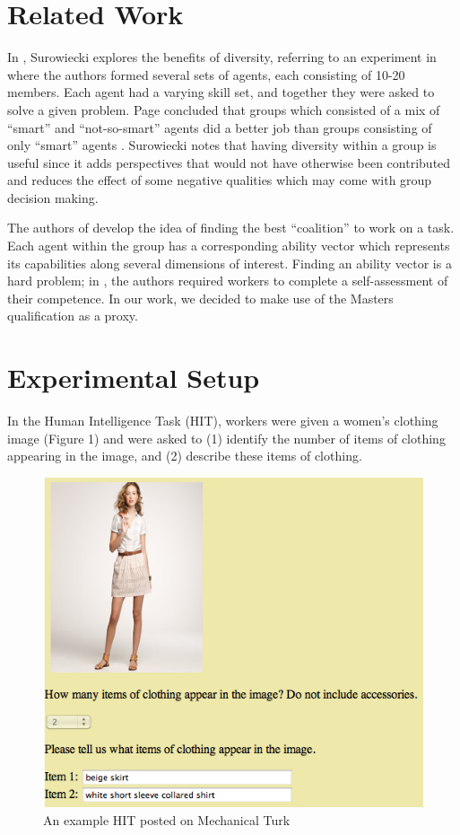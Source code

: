 \documentclass{chi2012}
\newcommand{\tab}{\hspace*{2em}}
\begin{document}
\section{Related Work}
\tab In \cite{wisdomOfCrowds}, Surowiecki explores the benefits of diversity, referring to an experiment in \cite{HongPage:2000} where the authors formed several sets of agents, each consisting of 10-20 members. Each agent had a varying skill set, and together they were asked to solve a given problem. Page concluded that groups which consisted of a mix of ``smart'' and ``not-so-smart'' agents did a better job than groups consisting of only ``smart'' agents \cite{HongPage:2000}. Surowiecki notes that having diversity within a group is useful since it adds perspectives that would not have otherwise been contributed and reduces the effect of some negative qualities which may come with group decision making.

\tab The authors of \cite{ShahafHorvitz:2010} develop the idea of finding the best ``coalition'' to work on a task. Each agent within the group has a corresponding ability vector which represents its capabilities along several dimensions of interest. Finding an ability vector is a hard problem; in \cite{ShahafHorvitz:2010}, the authors required workers to complete a self-assessment of their competence. In our work, we decided to make use of the Masters qualification as a proxy. 

\section{Experimental Setup}
\tab In the Human Intelligence Task (HIT), workers were given a women's clothing image (Figure 1) and were asked to (1) identify the number of items of clothing appearing in the image, and (2) describe these items of clothing. 

\begin{figure}
\centering
\includegraphics[width=0.9\columnwidth]{Figure1}
\caption{An example HIT posted on Mechanical Turk}
\label{fig:figure1}
\end{figure}
\end{document}
